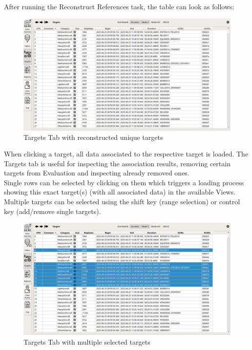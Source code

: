 After running the Reconstruct References task, the table can look as follows:

\begin{figure}[H]
  \hspace*{-2cm}
    \includegraphics[width=18cm,frame]{figures/ui_targets2.png}
  \caption{Targets Tab with reconstructed unique targets}
\end{figure}

When clicking a target, all data associated to the respective target is loaded. The Targets tab is useful for inspecting the association results, 
removing certain targets from Evaluation and inspecting already removed ones. \\

Single rows can be selected by clicking on them which triggers a loading process showing this exact target(s) (with all associated data) in the available Views. 
Multiple targets can be selected using the shift key (range selection) or control key (add/remove single targets).

\begin{figure}[H]
  \hspace*{-2cm}
    \includegraphics[width=18cm,frame]{figures/ui_targets3.png}
  \caption{Targets Tab with multiple selected targets}
\end{figure}

